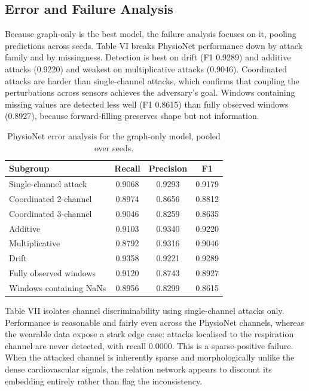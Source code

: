 \documentclass[conference]{IEEEtran}
\begin{document}
\subsection{Error and Failure Analysis}
Because graph-only is the best model, the failure analysis focuses on it, pooling predictions across seeds. Table VI breaks PhysioNet performance down by attack family and by missingness. Detection is best on drift (F1 0.9289) and additive attacks (0.9220) and weakest on multiplicative attacks (0.9046). Coordinated attacks are harder than single-channel attacks, which confirms that coupling the perturbations across sensors achieves the adversary's goal. Windows containing missing values are detected less well (F1 0.8615) than fully observed windows (0.8927), because forward-filling preserves shape but not information.
\begin{table}[t]
\caption{PhysioNet error analysis for the graph-only model, pooled over seeds.}
\label{tab:8}
\centering
\small
\begin{tabular}{lccc}
\toprule
Subgroup & Recall & Precision & F1 \\
\midrule
Single-channel attack & 0.9068 & 0.9293 & 0.9179 \\
Coordinated 2-channel & 0.8974 & 0.8656 & 0.8812 \\
Coordinated 3-channel & 0.9046 & 0.8259 & 0.8635 \\
Additive & 0.9103 & 0.9340 & 0.9220 \\
Multiplicative & 0.8792 & 0.9316 & 0.9046 \\
Drift & 0.9358 & 0.9221 & 0.9289 \\
Fully observed windows & 0.9120 & 0.8743 & 0.8927 \\
Windows containing NaNs & 0.8956 & 0.8299 & 0.8615 \\
\bottomrule
\end{tabular}
\end{table}
Table VII isolates channel discriminability using single-channel attacks only. Performance is reasonable and fairly even across the PhysioNet channels, whereas the wearable data expose a stark edge case: attacks localised to the respiration channel are never detected, with recall 0.0000. This is a sparse-positive failure. When the attacked channel is inherently sparse and morphologically unlike the dense cardiovascular signals, the relation network appears to discount its embedding entirely rather than flag the inconsistency.
\end{document}
